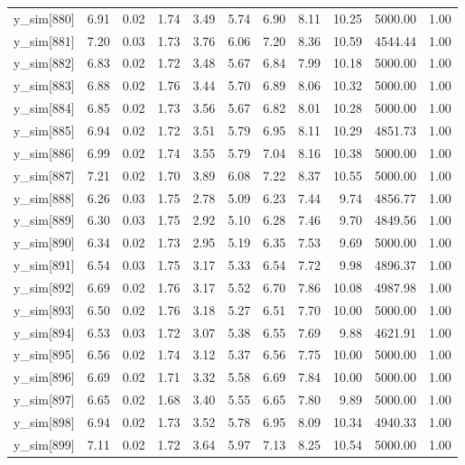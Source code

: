 \begin{table}[ht]
\begin{tabular}{rrrrrrrrrrr}
  y\_sim[880] & 6.91 & 0.02 & 1.74 & 3.49 & 5.74 & 6.90 & 8.11 & 10.25 & 5000.00 & 1.00 \\ 
  y\_sim[881] & 7.20 & 0.03 & 1.73 & 3.76 & 6.06 & 7.20 & 8.36 & 10.59 & 4544.44 & 1.00 \\ 
  y\_sim[882] & 6.83 & 0.02 & 1.72 & 3.48 & 5.67 & 6.84 & 7.99 & 10.18 & 5000.00 & 1.00 \\ 
  y\_sim[883] & 6.88 & 0.02 & 1.76 & 3.44 & 5.70 & 6.89 & 8.06 & 10.32 & 5000.00 & 1.00 \\ 
  y\_sim[884] & 6.85 & 0.02 & 1.73 & 3.56 & 5.67 & 6.82 & 8.01 & 10.28 & 5000.00 & 1.00 \\ 
  y\_sim[885] & 6.94 & 0.02 & 1.72 & 3.51 & 5.79 & 6.95 & 8.11 & 10.29 & 4851.73 & 1.00 \\ 
  y\_sim[886] & 6.99 & 0.02 & 1.74 & 3.55 & 5.79 & 7.04 & 8.16 & 10.38 & 5000.00 & 1.00 \\ 
  y\_sim[887] & 7.21 & 0.02 & 1.70 & 3.89 & 6.08 & 7.22 & 8.37 & 10.55 & 5000.00 & 1.00 \\ 
  y\_sim[888] & 6.26 & 0.03 & 1.75 & 2.78 & 5.09 & 6.23 & 7.44 & 9.74 & 4856.77 & 1.00 \\ 
  y\_sim[889] & 6.30 & 0.03 & 1.75 & 2.92 & 5.10 & 6.28 & 7.46 & 9.70 & 4849.56 & 1.00 \\ 
  y\_sim[890] & 6.34 & 0.02 & 1.73 & 2.95 & 5.19 & 6.35 & 7.53 & 9.69 & 5000.00 & 1.00 \\ 
  y\_sim[891] & 6.54 & 0.03 & 1.75 & 3.17 & 5.33 & 6.54 & 7.72 & 9.98 & 4896.37 & 1.00 \\ 
  y\_sim[892] & 6.69 & 0.02 & 1.76 & 3.17 & 5.52 & 6.70 & 7.86 & 10.08 & 4987.98 & 1.00 \\ 
  y\_sim[893] & 6.50 & 0.02 & 1.76 & 3.18 & 5.27 & 6.51 & 7.70 & 10.00 & 5000.00 & 1.00 \\ 
  y\_sim[894] & 6.53 & 0.03 & 1.72 & 3.07 & 5.38 & 6.55 & 7.69 & 9.88 & 4621.91 & 1.00 \\ 
  y\_sim[895] & 6.56 & 0.02 & 1.74 & 3.12 & 5.37 & 6.56 & 7.75 & 10.00 & 5000.00 & 1.00 \\ 
  y\_sim[896] & 6.69 & 0.02 & 1.71 & 3.32 & 5.58 & 6.69 & 7.84 & 10.00 & 5000.00 & 1.00 \\ 
  y\_sim[897] & 6.65 & 0.02 & 1.68 & 3.40 & 5.55 & 6.65 & 7.80 & 9.89 & 5000.00 & 1.00 \\ 
  y\_sim[898] & 6.94 & 0.02 & 1.73 & 3.52 & 5.78 & 6.95 & 8.09 & 10.34 & 4940.33 & 1.00 \\ 
  y\_sim[899] & 7.11 & 0.02 & 1.72 & 3.64 & 5.97 & 7.13 & 8.25 & 10.54 & 5000.00 & 1.00 \\ 

\end{tabular}
\end{table}
